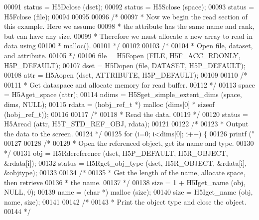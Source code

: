 \begin{DoxyCode}
00091     status = H5Dclose (dset);
00092     status = H5Sclose (space);
00093     status = H5Fclose (file);
00094 
00095 
00096     \textcolor{comment}{/*}
00097 \textcolor{comment}{     * Now we begin the read section of this example.  Here we assume}
00098 \textcolor{comment}{     * the attribute has the same name and rank, but can have any size.}
00099 \textcolor{comment}{     * Therefore we must allocate a new array to read in data using}
00100 \textcolor{comment}{     * malloc().}
00101 \textcolor{comment}{     */}
00102 
00103     \textcolor{comment}{/*}
00104 \textcolor{comment}{     * Open file, dataset, and attribute.}
00105 \textcolor{comment}{     */}
00106     file = H5Fopen (FILE, H5F\_ACC\_RDONLY, H5P\_DEFAULT);
00107     dset = H5Dopen (file, DATASET, H5P\_DEFAULT);
00108     attr = H5Aopen (dset, ATTRIBUTE, H5P\_DEFAULT);
00109 
00110     \textcolor{comment}{/*}
00111 \textcolor{comment}{     * Get dataspace and allocate memory for read buffer.}
00112 \textcolor{comment}{     */}
00113     space = H5Aget\_space (attr);
00114     ndims = H5Sget\_simple\_extent\_dims (space, dims, NULL);
00115     rdata = (hobj\_ref\_t *) malloc (dims[0] * \textcolor{keyword}{sizeof} (hobj\_ref\_t));
00116 
00117     \textcolor{comment}{/*}
00118 \textcolor{comment}{     * Read the data.}
00119 \textcolor{comment}{     */}
00120     status = H5Aread (attr, H5T\_STD\_REF\_OBJ, rdata);
00121 
00122     \textcolor{comment}{/*}
00123 \textcolor{comment}{     * Output the data to the screen.}
00124 \textcolor{comment}{     */}
00125     \textcolor{keywordflow}{for} (i=0; i<dims[0]; i++) \{
00126         printf (\textcolor{stringliteral}{"%
00127 
00128         \textcolor{comment}{/*}
00129 \textcolor{comment}{         * Open the referenced object, get its name and type.}
00130 \textcolor{comment}{         */}
00131         obj = H5Rdereference (dset, H5P\_DEFAULT, H5R\_OBJECT, &rdata[i]);
00132         status = H5Rget\_obj\_type (dset, H5R\_OBJECT, &rdata[i], &objtype);
00133 
00134         \textcolor{comment}{/*}
00135 \textcolor{comment}{         * Get the length of the name, allocate space, then retrieve}
00136 \textcolor{comment}{         * the name.}
00137 \textcolor{comment}{         */}
00138         size = 1 + H5Iget\_name (obj, NULL, 0);
00139         name = (\textcolor{keywordtype}{char} *) malloc (size);
00140         size = H5Iget\_name (obj, name, size);
00141 
00142         \textcolor{comment}{/*}
00143 \textcolor{comment}{         * Print the object type and close the object.}
00144 \textcolor{comment}{         */}
}
\end{DoxyCode}
